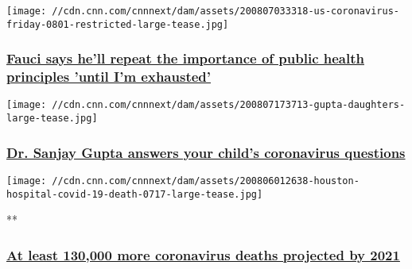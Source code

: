 \href{/2020/08/07/health/us-coronavirus-friday/index.html}{}

\texttt{[image: //cdn.cnn.com/cnnnext/dam/assets/200807033318-us-coronavirus-friday-0801-restricted-large-tease.jpg]}

\hypertarget{fauci-says-hell-repeat-the-importance-of-public-health-principles-until-im-exhausted-1}{%
\subsubsection{\texorpdfstring{\href{/2020/08/07/health/us-coronavirus-friday/index.html}{Fauci
says he'll repeat the importance of public health principles 'until I'm
exhausted'}}{Fauci says he'll repeat the importance of public health principles 'until I'm exhausted'}}\label{fauci-says-hell-repeat-the-importance-of-public-health-principles-until-im-exhausted-1}}

\href{/2020/08/07/health/coronavirus-kid-questions-gupta/index.html}{}

\texttt{[image: //cdn.cnn.com/cnnnext/dam/assets/200807173713-gupta-daughters-large-tease.jpg]}

\hypertarget{dr-sanjay-gupta-answers-your-childs-coronavirus-questions-1}{%
\subsubsection{\texorpdfstring{\href{/2020/08/07/health/coronavirus-kid-questions-gupta/index.html}{Dr.
Sanjay Gupta answers your child's coronavirus
questions}}{Dr. Sanjay Gupta answers your child's coronavirus questions}}\label{dr-sanjay-gupta-answers-your-childs-coronavirus-questions-1}}

\href{/videos/health/2020/08/07/coronavirus-wrap-us-death-rate-december-130000-sidner-dnt-lead-vpx.cnn}{}

\texttt{[image: //cdn.cnn.com/cnnnext/dam/assets/200806012638-houston-hospital-covid-19-death-0717-large-tease.jpg]}

**

\hypertarget{at-least-130000-more-coronavirus-deaths-projected-by-2021}{%
\subsubsection{\texorpdfstring{\href{/videos/health/2020/08/07/coronavirus-wrap-us-death-rate-december-130000-sidner-dnt-lead-vpx.cnn}{At
least 130,000 more coronavirus deaths projected by
2021}}{At least 130,000 more coronavirus deaths projected by 2021}}\label{at-least-130000-more-coronavirus-deaths-projected-by-2021}}

